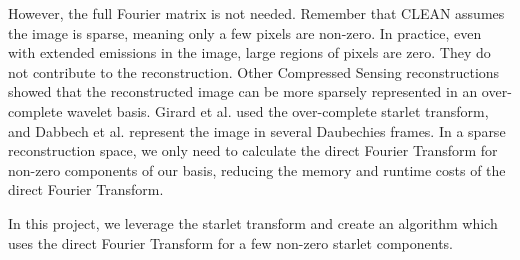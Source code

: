 However, the full Fourier matrix is not needed. Remember that CLEAN assumes the image is sparse, meaning only a few pixels are non-zero. In practice, even with extended emissions in the image, large regions of pixels are zero. They do not contribute to the reconstruction. Other Compressed Sensing reconstructions showed that the reconstructed image can be more sparsely represented in an over-complete wavelet basis. Girard et al.\cite{girard2015sparse} used the over-complete starlet transform, and Dabbech et al.\cite{dabbech2018cygnus} represent the image in several Daubechies frames. In a sparse reconstruction space, we only need to calculate the direct Fourier Transform for non-zero components of our basis, reducing the memory and runtime costs of the direct Fourier Transform.

In this project, we leverage the starlet transform and create an algorithm which uses the direct Fourier Transform for a few non-zero starlet components.